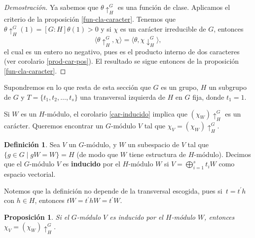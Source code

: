\documentclass[12pt]{book}
\newtheorem{proposition}[theorem]{Proposición}
\theoremstyle{definition}
\newtheorem{definition}[theorem]{Definición}
\newcounter{in}
\newcounter{ini}
\begin{document}
\begin{proof}[Demostración]
  Ya sabemos que $\theta\uparrow^{G}_{H}$ es una función de
  clase. Aplicamos el criterio de la proposición
  \ref{fun-cla-caracter}. Tenemos que
  $\theta\uparrow^{G}_{H}(1)=[G:H]\theta(1)>0$ y si $\chi$ es un
  carácter irreducible de $G$, entonces
  \begin{equation*}
    \langle\theta\uparrow^{G}_{H},\chi\rangle=\langle\theta,\chi\downarrow^{G}_{H}\rangle,
  \end{equation*}
  el cual es un entero no negativo, pues es el producto interno de dos
  caracteres (ver corolario \ref{prod-car-pos}). El resultado se sigue entonces de la proposición
  \ref{fun-cla-caracter}.
\end{proof}
Supondremos en lo que resta de esta sección que $G$ es un grupo, $H$ un subgrupo de
$G$  y $T=\{t_{1},t_{2},\ldots,t_{s}\}$ una transversal izquierda de
$H$ en $G$ fija, donde $t_{1}=1$.

Si $W$ es un $H$-módulo, el corolario \ref{car-inducido} implica que
$(\chi_{W})\uparrow^{G}_{H}$ es un carácter. Queremos encontrar un
$G$-módulo $V$ tal que $\chi_{V}=(\chi_{W})\uparrow^{G}_{H}$.

\begin{definition}
  Sea $V$ un $G$-módulo, y $W$ un subespacio de $V$ tal que $\{g\in
  G\mid gW=W\}=H$ (de modo que $W$ tiene estructura de $H$-módulo). Decimos que el
  $G$-módulo $V$ es \textbf{inducido} por el $H$-módulo $W$ si
  $V=\bigoplus^{s}_{i=1}t_{i}W$ como espacio vectorial.
\end{definition}

Notemos que la definición no depende de la transversal escogida, pues
si~$t=t^{'}h$ con $h\in H$, entonces $tW=t^{'}hW=t^{'}W$. 

\begin{proposition}
  \label{car-ind-W-V}
  Si el $G$-módulo $V$ es inducido por el $H$-módulo $W$, entonces
  $\chi_{V}=(\chi_{W})\uparrow^{G}_{H}$.
\end{proposition}
\end{document}
